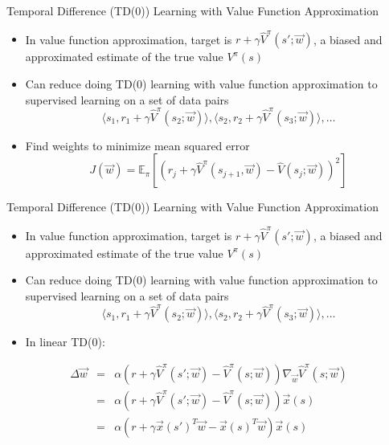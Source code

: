 \begin{frame}[c]{Temporal Difference (TD(0)) Learning with Value
		Function Approximation}
	
	\begin{itemize}
		\item In value function approximation, target is $r + \gamma \hat{V}^\pi (s'; \vec{w})$, a biased and approximated estimate of the true value $V^\pi(s)$
		\item Can reduce doing TD(0) learning with value function approximation to supervised learning on a set of data pairs
		$$\langle  s_1, r_1+ \gamma \hat{V}^\pi (s_2; \vec{w}) \rangle, \langle  s_2, r_2+ \gamma \hat{V}^\pi (s_3; \vec{w}) \rangle, \ldots $$
		\item Find weights to minimize mean squared error
		$$J(\vec{w}) = \mathbb{E}_\pi [(r_j + \gamma \hat{V}^\pi(s_{j+1}, \vec{w}) - \hat{V}(s_j;\vec{w}))^2]$$
	\end{itemize}
	
\end{frame}
\begin{frame}[c]{Temporal Difference (TD(0)) Learning with Value
		Function Approximation}
	
	\begin{itemize}
		\item In value function approximation, target is $r + \gamma \hat{V}^\pi (s'; \vec{w})$, a biased and approximated estimate of the true value $V^\pi(s)$
		\item Can reduce doing TD(0) learning with value function approximation to supervised learning on a set of data pairs
		$$\langle  s_1, r_1+ \gamma \hat{V}^\pi (s_2; \vec{w}) \rangle, \langle  s_2, r_2+ \gamma \hat{V}^\pi (s_3; \vec{w}) \rangle, \ldots $$
		\item In linear TD(0):
	\end{itemize}

\begin{eqnarray}
\Delta \vec{w} &=& \alpha( r + \gamma \hat{V}^\pi(s'; \vec{w}) - \hat{V}^\pi(s;\vec{w})) \nabla_\vec{w} \hat{V}^\pi (s;\vec{w})\nonumber\\
&=& \alpha( r + \gamma \hat{V}^\pi(s'; \vec{w}) - \hat{V}^\pi(s;\vec{w})) \vec{x}(s)\nonumber\\
&=& \alpha( r + \gamma \vec{x}(s')^T \vec{w} - \vec{x}(s)^T\vec{w}) \vec{x}(s)\nonumber
\end{eqnarray}
	
\end{frame}
